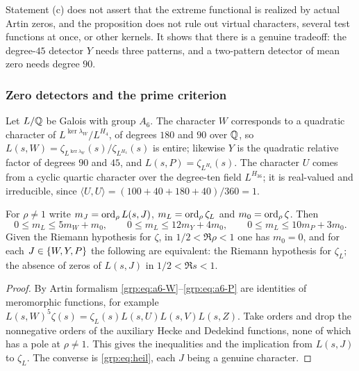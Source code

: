 Statement (c) does not assert that the extreme functional is realized by
actual Artin zeros, and the proposition does not rule out virtual characters,
several test functions at once, or other kernels. It shows that there is a
genuine tradeoff: the degree-$45$ detector $Y$ needs three patterns, and a
two-pattern detector of mean zero needs degree $90$.

\subsubsection{Zero detectors and the prime criterion}
Let $L/\mathbb{Q}$ be Galois with group $A_6$. The character $W$ corresponds to a
quadratic character of $L^{\ker\lambda_W}/L^{H_4}$, of degrees $180$ and $90$
over $\mathbb{Q}$, so $L(s,W)=\zeta_{L^{\ker\lambda_W}}(s)/\zeta_{L^{H_4}}(s)$ is
entire; likewise $Y$ is the quadratic relative factor of degrees $90$ and
$45$, and $L(s,P)=\zeta_{L^{H_4}}(s)$. The character $U$ comes from a cyclic
quartic character over the degree-ten field $L^{H_{36}}$; it is real-valued
and irreducible, since $\langle U,U\rangle=(100+40+180+40)/360=1$.

\begin{theorem}\label{grp:thm:a6-orders}
For $\rho\ne1$ write $m_J=\operatorname{ord}_\rho L(s,J)$, $m_L=\operatorname{ord}_\rho\zeta_L$ and
$m_0=\operatorname{ord}_\rho\zeta$. Then
\[
 0\le m_L\le5m_W+m_0,\qquad
 0\le m_L\le12m_Y+4m_0,\qquad
 0\le m_L\le10m_P+3m_0 .
\]
Given the Riemann hypothesis for $\zeta$, in $1/2<\Re\rho<1$ one has $m_0=0$,
and for each $J\in\{W,Y,P\}$ the following are equivalent: the Riemann
hypothesis for $\zeta_L$; the absence of zeros of $L(s,J)$ in $1/2<\Re s<1$.
\end{theorem}

\begin{proof}
By Artin formalism \eqref{grp:eq:a6-W}--\eqref{grp:eq:a6-P} are identities of
meromorphic functions, for example
$L(s,W)^5\zeta(s)=\zeta_L(s)L(s,U)L(s,V)L(s,Z)$. Take orders and drop the
nonnegative orders of the auxiliary Hecke and Dedekind functions, none of which
has a pole at $\rho\ne1$. This gives the inequalities and the implication from
$L(s,J)$ to $\zeta_L$. The converse is \eqref{grp:eq:heil}, each $J$ being a
genuine character.
\end{proof}

